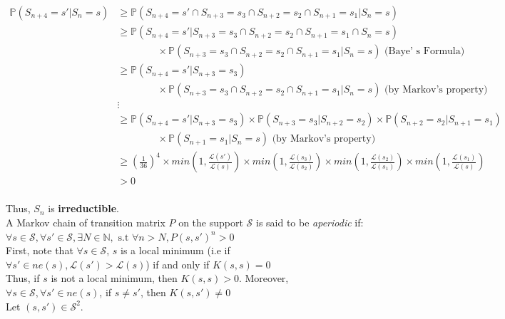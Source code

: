 $
\begin{aligned}
    \mathbb{P}(S_{n+4}=s'\vert S_n = s ) & \geqslant \mathbb{P}(S_{n+4} = s' \cap  S_{n+3}= s_3 \cap S_{n+2} = s_2 \cap S_{n+1} = s_1 \vert S_n = s) \\
    & \geqslant \mathbb{P}(S_{n+4} = s' \vert S_{n+3} = s_3 \cap S_{n+2} = s_2 \cap S_{n+1} = s_1 \cap S_n = s) \\
    & \quad\quad\quad\quad \times \mathbb{P}( S_{n+3} = s_3 \cap S_{n+2} = s_2 \cap S_{n+1} = s_1 \vert S_n = s) \text{  (Baye' s Formula)}\\
    & \geqslant \mathbb{P}(S_{n+4} = s' \vert S_{n+3} = s_3)\\
    & \quad\quad\quad\quad  \times \mathbb{P}( S_{n+3} = s_3 \cap S_{n+2} = s_2 \cap S_{n+1} = s_1 \vert S_n = s)  \text{ (by Markov's property)}\\
    & \vdots \\
    & \geqslant \mathbb{P}(S_{n+4} = s' \vert S_{n+3} = s_3) \times \mathbb{P}( S_{n+3} = s_3 \vert S_{n+2} = s_2) \times \mathbb{P}( S_{n+2} = s_2 \vert S_{n+1} = s_1) \\
    & \quad\quad\quad\quad \times \mathbb{P}( S_{n+1} = s_1 \vert S_n = s ) \text{ (by Markov's property)}\\
    & \geqslant (\frac{1}{36})^4 \times min (1, \frac{\mathcal{L}(s')}{\mathcal{L}(s)}) \times min (1, \frac{\mathcal{L}(s_3)}{\mathcal{L}(s_2)}) \times min (1, \frac{\mathcal{L}(s_2)}{\mathcal{L}(s_1)}) \times min (1, \frac{\mathcal{L}(s_1)}{\mathcal{L}(s)})  \\
    & > 0 \\
\end{aligned}
$

Thus, $S_n$ is \textbf{irreductible}.\\

A Markov chain of transition matrix $P$ on the support $\mathcal{S}$ is said to be \textit{aperiodic} if: \\
$\forall s \in \mathcal{S}, \forall s' \in \mathcal{S}, \exists N \in \mathbb{N}, \text{ s.t } \forall n > N, P(s, s')^n >0 $ \cite{bodineau2015modelisation}\\

First, note that $\forall s \in \mathcal{S}$,  $s$ is a local minimum (i.e if $\forall s' \in ne(s), \mathcal{L}(s') > \mathcal{L}(s) $) if and only if $K(s,s)=0$\\

Thus, if $s$ is not a local minimum, then $K(s, s)>0$. Moreover, $ \forall s \in \mathcal{S}, \forall s' \in ne(s)$, if $s\neq s'$, then $K(s, s') \neq 0 $\\[0.3cm]
Let $(s, s')  \in \mathcal{S}^2$. \\

